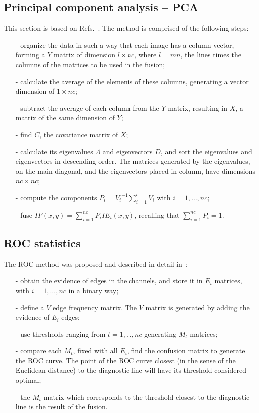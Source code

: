 \documentclass[conference]{IEEEtran}
\begin{document}
\subsection{Principal component analysis -- PCA}

This section is based on Refs.~\cite{n_r,mit}.
The method is comprised of the following steps:
\begin{itemize}
\item[-] organize the data in such a way that each image has a column vector, forming a $Y$ matrix of dimension $l\times nc$, where $l=m n$, the lines times the columns of the matrices to be used in the fusion;
\item[-] calculate the average of the elements of these columns, generating a vector dimension of $1\times nc$;
\item[-] subtract the average of each column from the $Y$ matrix, resulting in $X$, a matrix of the same dimension of $Y$; 
\item[-] find $C$, the covariance matrix of $X$;
\item[-] calculate its eigenvalues $\Lambda$ and eigenvectors $D$, and sort the eigenvalues and eigenvectors in descending order. The matrices generated by the eigenvalues, on the main diagonal, and the eigenvectors placed in column, have dimensions $nc\times nc$;
\item[-] compute the components $P_i={V_i}^{-1}{\sum_{i=1}^l V_i}$ with $i=1,\dots,nc$;
\item[-] fuse $IF(x,y)=\sum_{i=1}^{nc}P_iIE_i(x,y)$, recalling that $\sum_{i=1}^{nc}P_i=1$.
\end{itemize}

\subsection{ROC statistics}

The ROC method was proposed and described in detail in~\cite{gs,fawcett}:
\begin{itemize}
\item[-] obtain the evidence of edges in the channels, and store it in $E_i$ matrices, with $i=1,\dots,nc$ in a binary way;
\item[-] define a $V$ edge frequency matrix. The $V$ matrix is generated by adding the evidence of $E_i$ edges;
\item[-] use thresholds ranging from $t=1,\dots,nc$ generating $M_t$ matrices;
\item[-] compare each $M_t$, fixed with all $E_i$, find the confusion matrix to generate the ROC curve. The point of the ROC curve closest (in the sense of the Euclidean distance) to the diagnostic line will have its threshold considered optimal;
\item[-] the $M_t$ matrix which corresponds to the threshold closest to the diagnostic line is the result of the fusion.
\end{itemize}
\end{document}
